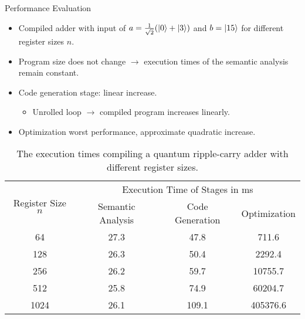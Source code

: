\begin{frame}{Performance Evaluation}
    \begin{itemize}
        \item Compiled adder with input of $a = \frac{1}{\sqrt{2}} (\ket{0} + \ket{3})$ and $b = \ket{15}$ for different register sizes $n$.
        \item Program size does not change $\to$ execution times of the semantic analysis remain constant.
        \item Code generation stage: linear increase.
        \begin{itemize}
            \item Unrolled loop $\to$ compiled program increases linearly.
        \end{itemize}
        \item Optimization worst performance, approximate quadratic increase.
    \end{itemize}
    \begin{table}[htp]
        \centering     
        \begin{tabular}{c|ccc}
        \multirow{2}{*}{Register Size $n$} & \multicolumn{3}{c}{Execution Time of Stages in ms}                                                  \\ \cline{2-4} 
                                           & \multicolumn{1}{c|}{Semantic Analysis} & \multicolumn{1}{c|}{Code Generation} & Optimization \\ \hline
        64                                 & \multicolumn{1}{c|}{27.3}                & \multicolumn{1}{c|}{47.8}              & 711.6          \\
        128                                & \multicolumn{1}{c|}{26.3}                & \multicolumn{1}{c|}{50.4}              & 2292.4         \\
        256                                & \multicolumn{1}{c|}{26.2}                & \multicolumn{1}{c|}{59.7}              & 10755.7        \\
        512                                & \multicolumn{1}{c|}{25.8}                & \multicolumn{1}{c|}{74.9}              & 60204.7        \\
        1024                               & \multicolumn{1}{c|}{26.1}                & \multicolumn{1}{c|}{109.1}             & 405376.6      
    \end{tabular}
    \caption{The execution times compiling a quantum ripple-carry adder with different register sizes.}
    \end{table}
    
\end{frame}